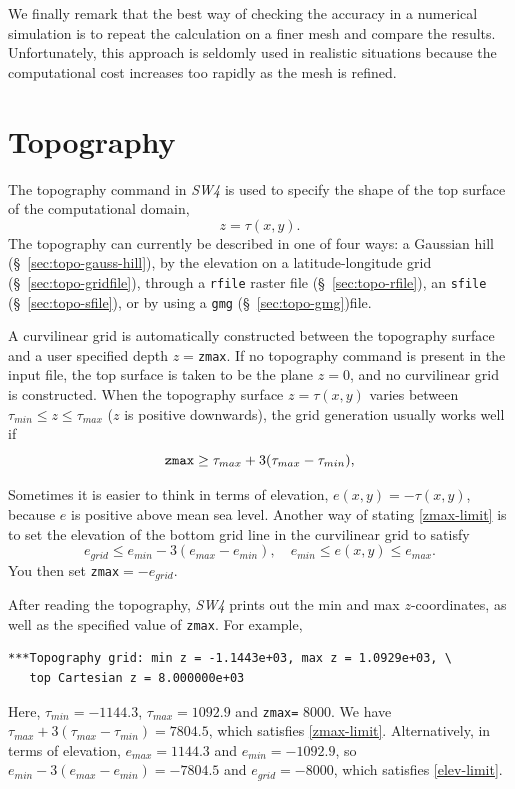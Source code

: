 \documentclass[11pt]{report}
\begin{document}
We finally remark that the best way of checking the accuracy in a numerical simulation is to repeat
the calculation on a finer mesh and compare the results. Unfortunately, this approach is seldomly
used in realistic situations because the computational cost increases too rapidly as the mesh is refined.

\chapter{Topography} \label{sec:topography}

The topography command in \emph{SW4} is used to specify the shape of the top surface of the
computational domain,
\[
z=\tau(x,y).
\]
The topography can currently be described in one of four ways: a Gaussian hill
(\S~\ref{sec:topo-gauss-hill}), by the elevation on a latitude-longitude grid
(\S~\ref{sec:topo-gridfile}), through a \verb+rfile+ raster file (\S~\ref{sec:topo-rfile}), an \verb+sfile+ (\S~\ref{sec:topo-sfile}), or by
using a \verb+gmg+ (\S~\ref{sec:topo-gmg})file.

A curvilinear grid is automatically constructed between the topography surface and a user specified depth
$z=$\verb+zmax+. If no topography command is present in the input file, the top surface is taken to
be the plane $z=0$, and no curvilinear grid is constructed. When the topography surface $z=\tau(x,y)$ varies between
$\tau_{min}\leq z\leq \tau_{max}$ ($z$ is positive downwards), the grid generation usually works well if
\begin{equation}\label{zmax-limit}
\mbox{\tt zmax} \geq \tau_{max} + 3(\tau_{max}-\tau_{min}),
\end{equation}

Sometimes it is easier to think in terms of elevation, $e(x,y)=-\tau(x,y)$, because $e$ is positive
above mean sea level. Another way of stating \eqref{zmax-limit} is to set the elevation of the
bottom grid line in the curvilinear grid to satisfy
\begin{equation}
\label{elev-limit}
e_{grid} \leq e_{min} - 3(e_{max} - e_{min}),\quad e_{min}\leq e(x,y) \leq e_{max}.
\end{equation}
You then set \verb+zmax+$=-e_{grid}$.

After reading the topography, \emph{SW4} prints out the min and max $z$-coordinates, as well as the
specified value of \verb+zmax+. For example,
\begin{verbatim}
***Topography grid: min z = -1.1443e+03, max z = 1.0929e+03, \
   top Cartesian z = 8.000000e+03
\end{verbatim}
Here, $\tau_{min} = -1144.3$, $\tau_{max} = 1092.9$ and \verb+zmax=+ 8000.  We have $\tau_{max} +
3(\tau_{max}-\tau_{min})=7804.5$, which satisfies \eqref{zmax-limit}. Alternatively, in terms of
elevation, $e_{max}=1144.3$ and $e_{min}=-1092.9$, so $e_{min} - 3(e_{max}-e_{min}) = -7804.5$ and
$e_{grid}=-8000$, which satisfies \eqref{elev-limit}.
\end{document}

